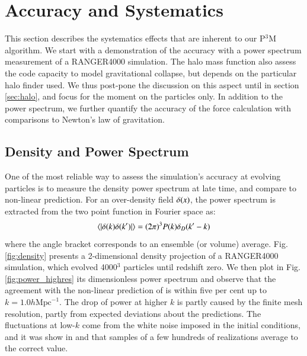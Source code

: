 \section{Accuracy and Systematics}
\label{sec:accuracy}
 
 This section describes the systematics effects that are inherent to our P$^{3}$M algorithm.
 We start with a demonstration of the accuracy with a power spectrum measurement of a RANGER4000 simulation. 
 The halo mass function also assess the code capacity to model gravitational collapse, 
 but depends on the particular halo finder used.
 We thus post-pone the discussion on this aspect until in section \ref{sec:halo},
and focus for the moment on the particles only. In addition to the power spectrum, we further quantify the accuracy of the force calculation
 with comparisons to Newton's law of gravitation.
 
 
 \subsection{Density and Power Spectrum}
 \label{subsec:powerspectrum}
 
One of the most reliable way to assess the simulation's accuracy at evolving particles
is to measure the density power spectrum at late time, and compare to non-linear prediction. 
For an over-density field $\delta({\bf \it x})$, the power spectrum is extracted from the two point function in Fourier space as:
\begin{eqnarray}
\langle | \delta ({\bf \it k}) \delta ({\bf \it k'}) | \rangle = (2\pi)^{3}P(k)\delta_{D}({\bf \it k'} - {\bf \it k})
\label{eq:power}
\end{eqnarray}
where the angle bracket corresponds to an ensemble (or volume) average.
Fig. \ref{fig:density} presents  a 2-dimensional density projection of a RANGER4000 simulation, which evolved 4000$^3$ particles until redshift zero.
We then plot in Fig. \ref{fig:power_highres}  its dimensionless power spectrum  and
observe that the agreement with the non-linear prediction of \cite{Lewis:1999bs} is within five per cent up to $k = 1.0 h \mbox{Mpc}^{-1}$.
The drop of power at higher $k$ is partly caused by the finite mesh resolution, partly from expected deviations about the predictions.
The fluctuations at low-$k$ come from the white noise imposed in the initial conditions, and it was show in \citet{2012MNRAS.419.2949N} and 
\citet{2012MNRAS.423.2288H} that
samples of a few hundreds of realizations average to the correct value. 

